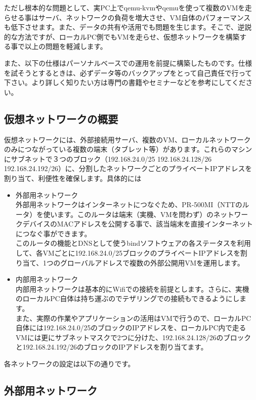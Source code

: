 \documentclass[mingoth,a4paper]{jsarticle}
\begin{document}
ただし根本的な問題として、実PC上でqemu-kvmやqemuを使って複数のVMを走らせる事はサーバ、ネットワークの負荷を増大させ、VM自体のパフォーマンスも低下させます。また、データの共有や活用でも問題を生じます。そこで、逆説的な方法ですが、ローカルPC側でもVMを走らせ、仮想ネットワークを構築する事で以上の問題を軽減します。

また、以下の仕様はパーソナルベースでの運用を前提に構築したものです。仕様を試そうとするときは、必ずデータ等のバックアップをとって自己責任で行って下さい。より詳しく知りたい方は専門の書籍やセミナーなどを参考にしてください。

\subsection{仮想ネットワークの概要}
仮想ネットワークには、外部接続用サーバ、複数のVM、ローカルネットワークのみにつながっている複数の端末（タブレット等）があります。これらのマシンにサブネットで３つのブロック（192.168.24.0/25 192.168.24.128/26 192.168.24.192/26）に、分割したネットワークごとのプライベートIPアドレスを割り当て、利便性を確保します。具体的には
\begin{itemize}
\item 外部用ネットワーク\\
  外部用ネットワークはインターネットにつなぐため、PR-500MI（NTTのルータ）を使います。このルータは端末（実機、VMを問わず）のネットワークデバイスのMACアドレスを公開する事で、該当端末を直接インターネットにつなぐ事ができます。\\
  このルータの機能とDNSとして使うbindソフトウェアの各ステータスを利用して、各VMごとに192.168.24.0/25ブロックのプライベートIPアドレスを割り当て、1つのグローバルアドレスで複数の外部公開用VMを運用します。
\clearpage
\item 内部用ネットワーク\\
  内部用ネットワークは基本的にWifiでの接続を前提とします。さらに、実機のローカルPC自体は持ち運ぶのでテザリングでの接続もできるようにします。\\
  また、実際の作業やアプリケーションの活用はVMで行うので、ローカルPC自体には192.168.24.0/25のブロックのIPアドレスを、ローカルPC内で走るVMには更にサブネットマスクで2つに分けた、192.168.24.128/26のブロックと192.168.24.192/26のブロックのIPアドレスを割り当てます。
\end{itemize}
各ネットワークの設定は以下の通りです。

\subsection{外部用ネットワーク}
\end{document}
